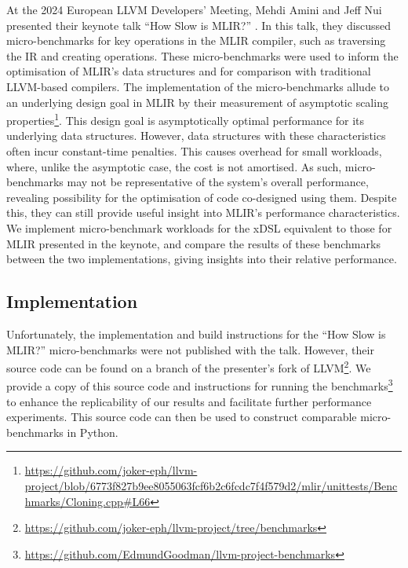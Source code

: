 At the 2024 European LLVM Developers' Meeting, Mehdi Amini and Jeff Nui presented their keynote talk ``How Slow is MLIR?'' \cite{aminiHowSlowMLIR2024}.
In this talk, they discussed micro-benchmarks for key operations in the MLIR compiler, such as traversing the IR and creating operations. These micro-benchmarks were used to inform the optimisation of MLIR's data structures and for comparison with traditional LLVM-based compilers. The implementation of the micro-benchmarks allude to an underlying design goal in MLIR by their measurement of asymptotic scaling properties\footnote{\url{https://github.com/joker-eph/llvm-project/blob/6773f827b9ee8055063fcf6b2c6fcdc7f4f579d2/mlir/unittests/Benchmarks/Cloning.cpp\#L66}}. This design goal is asymptotically optimal performance for its underlying data structures. However, data structures with these characteristics often incur constant-time penalties. %
This causes overhead for small workloads, where, unlike the asymptotic case, the cost is not amortised. As such, micro-benchmarks may not be representative of the system's overall performance, revealing possibility for the optimisation of code co-designed using them.
Despite this, they can still provide useful insight into MLIR's performance characteristics. 
We implement micro-benchmark workloads for the xDSL equivalent to those for MLIR presented in the keynote, and compare the results of these benchmarks between the two implementations, giving insights into their relative performance.

\subsection{Implementation}
\label{ssec:ubenchmark-implementation}

Unfortunately, the implementation and build instructions for the ``How Slow is MLIR?'' micro-benchmarks were not published with the talk.
However, their source code can be found on a branch of the presenter's fork of LLVM\footnote{\url{https://github.com/joker-eph/llvm-project/tree/benchmarks}}. We provide a copy of this source code and instructions for running the benchmarks\footnote{\url{https://github.com/EdmundGoodman/llvm-project-benchmarks}} to enhance the replicability of our results and facilitate further performance experiments.
This source code can then be used to construct comparable micro-benchmarks in Python.

